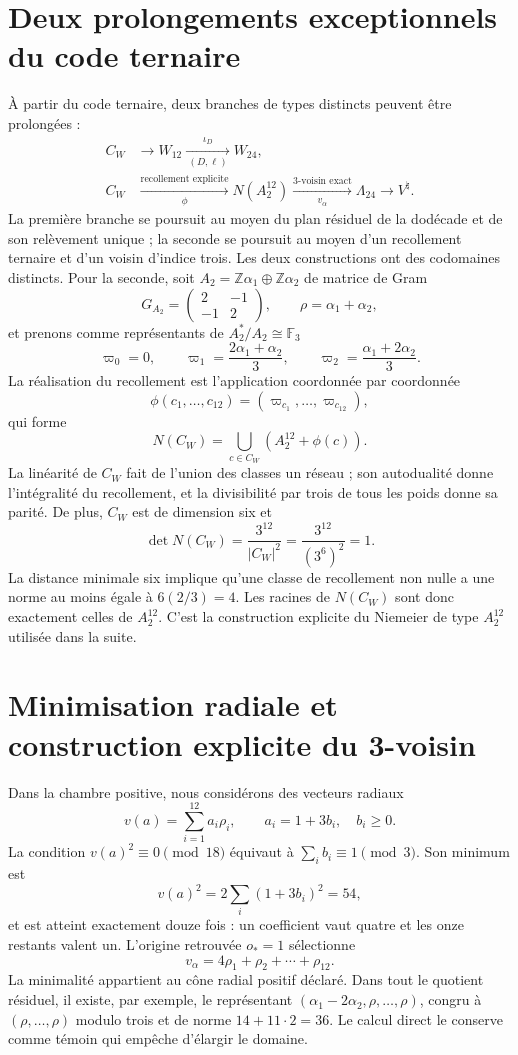 \section{Deux prolongements exceptionnels du code ternaire}

À partir du code ternaire, deux branches de types distincts peuvent être prolongées :
\[
\begin{aligned}
C_W&\longrightarrow W_{12}
\xrightarrow[\ (D,\ell)\ ]{\ \iota_D\ }W_{24},\\
C_W&\xrightarrow[\phi]{\text{recollement explicite}}N(A_2^{12})
\xrightarrow[v_\alpha]{\text{3-voisin exact}}\Lambda_{24}
\longrightarrow V^\natural .
\end{aligned}
\]
La première branche se poursuit au moyen du plan résiduel de la dodécade et de son
relèvement unique ; la seconde se poursuit au moyen d'un recollement ternaire et d'un voisin
d'indice trois. Les deux constructions ont des codomaines distincts. Pour la
seconde, soit \(A_2=\mathbb Z\alpha_1\oplus\mathbb Z\alpha_2\) de matrice
de Gram
\[
G_{A_2}=\begin{pmatrix}2&-1\\-1&2\end{pmatrix},
\qquad \rho=\alpha_1+\alpha_2,
\]
et prenons comme représentants de \(A_2^*/A_2\cong\mathbb F_3\)
\[
\varpi_0=0,\qquad
\varpi_1=\frac{2\alpha_1+\alpha_2}{3},\qquad
\varpi_2=\frac{\alpha_1+2\alpha_2}{3}.
\]
La réalisation du recollement est l'application coordonnée par coordonnée
\[
\phi(c_1,\ldots,c_{12})=(\varpi_{c_1},\ldots,\varpi_{c_{12}}),
\]
qui forme
\[
N(C_W)=\bigcup_{c\in C_W}(A_2^{12}+\phi(c)).
\]
La linéarité de \(C_W\) fait de l'union des classes un réseau ; son
autodualité donne l'intégralité du recollement, et la divisibilité par trois de
tous les poids donne sa parité. De plus, \(C_W\) est de dimension six et
\[
\det N(C_W)=\frac{3^{12}}{|C_W|^2}
=\frac{3^{12}}{(3^6)^2}=1.
\]
La distance minimale six implique qu'une classe de recollement non nulle a une norme
au moins égale à \(6(2/3)=4\). Les racines de \(N(C_W)\) sont donc exactement celles
de \(A_2^{12}\). C'est la construction explicite du Niemeier de type
\(A_2^{12}\) utilisée dans la suite.

\section{Minimisation radiale et construction explicite du 3-voisin}
\label{sec:vecino-leech-ejecutable}

Dans la chambre positive, nous considérons des vecteurs radiaux
\[
v(a)=\sum_{i=1}^{12}a_i\rho_i,
\qquad a_i=1+3b_i,\quad b_i\ge0.
\]
La condition \(v(a)^2\equiv0\pmod{18}\) équivaut à
\(\sum_i b_i\equiv1\pmod3\). Son minimum est
\[
v(a)^2=2\sum_i(1+3b_i)^2=54,
\]
et est atteint exactement douze fois : un coefficient vaut quatre et les onze
restants valent un. L'origine retrouvée \(o_*=1\) sélectionne
\[
v_\alpha=4\rho_1+\rho_2+\cdots+\rho_{12}.
\]
La minimalité appartient au cône radial positif déclaré. Dans tout le
quotient résiduel, il existe, par exemple, le représentant
\((\alpha_1-2\alpha_2,\rho,\ldots,\rho)\), congru à
\((\rho,\ldots,\rho)\) modulo trois et de norme \(14+11\cdot2=36\). Le
calcul direct le conserve comme témoin qui empêche d'élargir le domaine.

